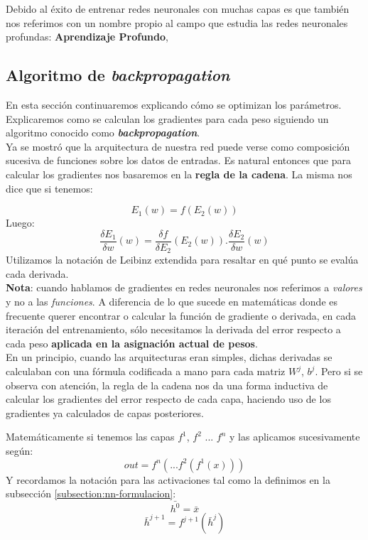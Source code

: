 Debido al éxito de entrenar redes neuronales con muchas capas es que también nos referimos con un nombre propio al campo que estudia las redes neuronales profundas: \textbf{Aprendizaje Profundo},

\subsection{Algoritmo de \textit{backpropagation}}

En esta sección continuaremos explicando cómo se optimizan los parámetros. Explicaremos como se calculan los gradientes para cada peso siguiendo un algoritmo conocido como \textit{\textbf{backpropagation}}.\\

Ya se mostró que la arquitectura de nuestra red puede verse como composición sucesiva de funciones sobre los datos de entradas. Es natural entonces que para calcular los gradientes nos basaremos en la \textbf{regla de la cadena}. La misma nos dice que si tenemos:

\begin{equation*}
    E_1(w) = f(E_2(w))
\end{equation*}
Luego:
\begin{equation*}
    \frac{\delta E_1}{\delta w}(w) = \frac{\delta f}{\delta E_2}(E_2(w)) . \frac{\delta E_2}{\delta w}(w)
\end{equation*}
Utilizamos la notación de Leibinz extendida para resaltar en qué punto se evalúa cada derivada.\\

\textbf{Nota}: cuando hablamos de gradientes en redes neuronales nos referimos a \textit{valores} y no a las \textit{funciones}. A diferencia de lo que sucede en matemáticas donde es frecuente querer encontrar o calcular la función de gradiente o derivada, en cada iteración del entrenamiento, sólo necesitamos la derivada del error respecto a cada peso \textbf{aplicada en la asignación actual de pesos}.\\
  
En un principio, cuando las arquitecturas eran simples, dichas derivadas se calculaban con una fórmula codificada a mano para cada matriz $W^j$, $b^j$.  Pero si se observa con atención, la regla de la cadena nos da una forma inductiva de calcular los gradientes del error respecto de cada capa, haciendo uso de los gradientes ya calculados de capas posteriores.

Matemáticamente si tenemos las capas $f^1$, $f^2$ ... $f^n$ y las aplicamos sucesivamente según:
\begin{equation*}
    out = f^n ( ... f^2 ( f^1 (x) ) )
\end{equation*}
Y recordamos la notación para las activaciones tal como la definimos en la subsección \ref{subsection:nn-formulacion}:
\begin{equation*}
    \bar{h^0} = \bar{x}
\end{equation*}
\begin{equation*}
    \bar{h}^{j+1} = f^{j+1}(\bar{h}^j)
\end{equation*}

